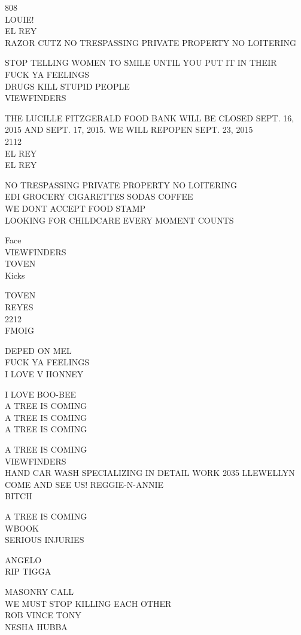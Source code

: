\documentclass[10pt,letterpaper]{article}
\begin{document}
808\\
LOUIE!\\
EL REY\\
RAZOR CUTZ NO TRESPASSING PRIVATE PROPERTY NO LOITERING

STOP TELLING WOMEN TO SMILE UNTIL YOU PUT IT IN THEIR\\
FUCK YA FEELINGS\\
DRUGS KILL STUPID PEOPLE\\
VIEWFINDERS

THE LUCILLE FITZGERALD FOOD BANK WILL BE CLOSED SEPT. 16, 2015 AND SEPT. 17, 2015.  WE WILL REPOPEN SEPT. 23, 2015\\
2112\\
EL REY\\
EL REY

NO TRESPASSING PRIVATE PROPERTY NO LOITERING\\
EDI GROCERY CIGARETTES SODAS COFFEE\\
WE DONT ACCEPT FOOD STAMP\\
LOOKING FOR CHILDCARE EVERY MOMENT COUNTS

Face\\
VIEWFINDERS\\
TOVEN\\
Kicks

TOVEN\\
REYES\\
2212\\
FMOIG

DEPED ON MEL\\
FUCK YA FEELINGS\\
I LOVE V HONNEY

I LOVE BOO{-}BEE\\
A TREE IS COMING\\
A TREE IS COMING\\
A TREE IS COMING

A TREE IS COMING\\
VIEWFINDERS\\
HAND CAR WASH SPECIALIZING IN DETAIL WORK 2035 LLEWELLYN COME AND SEE US!  REGGIE{-}N{-}ANNIE\\
BITCH

A TREE IS COMING\\
WBOOK\\
SERIOUS INJURIES

ANGELO\\
RIP TIGGA

MASONRY CALL\\
WE MUST STOP KILLING EACH OTHER\\
ROB VINCE TONY\\
NESHA HUBBA
\end{document}
